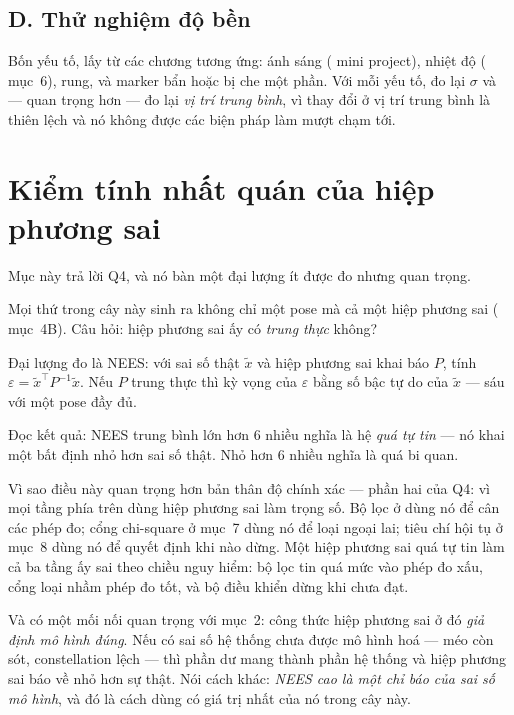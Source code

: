 \documentclass[../../marker.tex]{subfiles}
\begin{document}
\subsection{D. Thử nghiệm độ bền}

Bốn yếu tố, lấy từ các chương tương ứng: ánh sáng ( mini project), nhiệt độ ( mục~6), rung, và marker bẩn hoặc bị che một phần. Với mỗi yếu tố, đo lại \(\sigma\) và --- quan trọng hơn --- đo lại \emph{vị trí trung bình}, vì thay đổi ở vị trí trung bình là thiên lệch và nó không được các biện pháp làm mượt chạm tới.

\section{Kiểm tính nhất quán của hiệp phương sai}

Mục này trả lời Q4, và nó bàn một đại lượng ít được đo nhưng quan trọng.

Mọi thứ trong cây này sinh ra không chỉ một pose mà cả một hiệp phương sai ( mục~4B). Câu hỏi: hiệp phương sai ấy có \emph{trung thực} không?

Đại lượng đo là NEES: với sai số thật \(\tilde{x}\) và hiệp phương sai khai báo \(P\), tính \(\varepsilon = \tilde{x}^\top P^{-1}\tilde{x}\). Nếu \(P\) trung thực thì kỳ vọng của \(\varepsilon\) bằng số bậc tự do của \(\tilde{x}\) --- sáu với một pose đầy đủ.

Đọc kết quả: NEES trung bình lớn hơn 6 nhiều nghĩa là hệ \emph{quá tự tin} --- nó khai một bất định nhỏ hơn sai số thật. Nhỏ hơn 6 nhiều nghĩa là quá bi quan.

Vì sao điều này quan trọng hơn bản thân độ chính xác --- phần hai của Q4: vì mọi tầng phía trên dùng hiệp phương sai làm trọng số. Bộ lọc ở  dùng nó để cân các phép đo; cổng chi-square ở  mục~7 dùng nó để loại ngoại lai; tiêu chí hội tụ ở  mục~8 dùng nó để quyết định khi nào dừng. Một hiệp phương sai quá tự tin làm cả ba tầng ấy sai theo chiều nguy hiểm: bộ lọc tin quá mức vào phép đo xấu, cổng loại nhầm phép đo tốt, và bộ điều khiển dừng khi chưa đạt.

Và có một mối nối quan trọng với  mục~2: công thức hiệp phương sai ở đó \emph{giả định mô hình đúng}. Nếu có sai số hệ thống chưa được mô hình hoá --- méo còn sót, constellation lệch --- thì phần dư mang thành phần hệ thống và hiệp phương sai báo về nhỏ hơn sự thật. Nói cách khác: \emph{NEES cao là một chỉ báo của sai số mô hình}, và đó là cách dùng có giá trị nhất của nó trong cây này.
\end{document}
